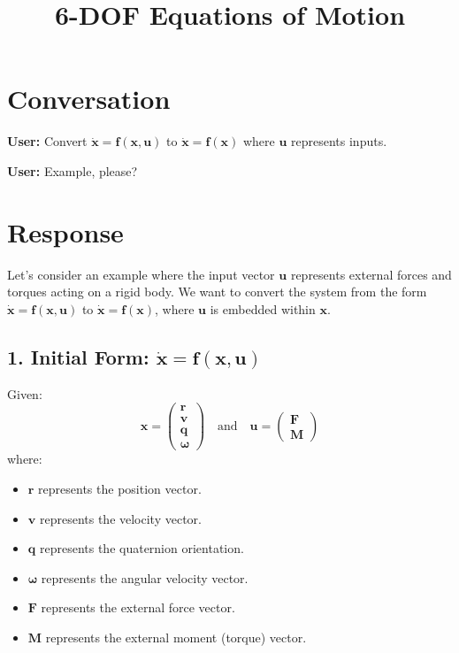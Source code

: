 \documentclass{article}
\title{6-DOF Equations of Motion}
\author{}
\date{}
\begin{document}
\maketitle

\section*{Conversation}

\textbf{User:} Convert \(\dot{\mathbf{x}} = \mathbf{f}(\mathbf{x}, \mathbf{u})\) to \(\dot{\mathbf{x}} = \mathbf{f}(\mathbf{x})\) where \(\mathbf{u}\) represents inputs.

\textbf{User:} Example, please?

\section*{Response}

Let's consider an example where the input vector \(\mathbf{u}\) represents external forces and torques acting on a rigid body. We want to convert the system from the form \(\dot{\mathbf{x}} = \mathbf{f}(\mathbf{x}, \mathbf{u})\) to \(\dot{\mathbf{x}} = \mathbf{f}(\mathbf{x})\), where \(\mathbf{u}\) is embedded within \(\mathbf{x}\).

\subsection*{1. Initial Form: \(\dot{\mathbf{x}} = \mathbf{f}(\mathbf{x}, \mathbf{u})\)}

Given:
\[
\mathbf{x} = \begin{pmatrix} \mathbf{r} \\ \mathbf{v} \\ \mathbf{q} \\ \boldsymbol{\omega} \end{pmatrix}
\quad \text{and} \quad
\mathbf{u} = \begin{pmatrix} \mathbf{F} \\ \mathbf{M} \end{pmatrix}
\]
where:
\begin{itemize}
    \item \(\mathbf{r}\) represents the position vector.
    \item \(\mathbf{v}\) represents the velocity vector.
    \item \(\mathbf{q}\) represents the quaternion orientation.
    \item \(\boldsymbol{\omega}\) represents the angular velocity vector.
    \item \(\mathbf{F}\) represents the external force vector.
    \item \(\mathbf{M}\) represents the external moment (torque) vector.
\end{itemize}
\end{document}
